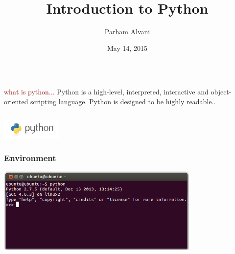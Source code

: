 \documentclass{beamer}
\title[Introduction]{Introduction to Python}
\author{Parham Alvani}
\institute[AUT] {
  Amirkabir University of Technology \\
  \medskip
  {\small\tt parham.alvani@gmail.com}
}
\date{May 14, 2015}
\begin{document}
\begin{frame}
\titlepage
\end{frame}


\section{}
\subsection{}

\begin{frame}
\begin{columns}
	\begin{column}{10cm}
		\vspace{2cm}
		\begin{block}{
				\centering\textcolor{darkred}{what is python...}}
				\justifying
				Python is a high-level, interpreted, interactive and object-oriented scripting language. Python is designed to be highly readable..\\
		\end{block}
	\end{column}
\end{columns}
\vspace{.75cm}
\hspace*{8.5cm}\includegraphics[width=3cm]{figs/python.jpeg}
\end{frame}

\begin{frame}
	\frametitle{Environment}
	\hspace*{1.5cm}\includegraphics[width=10cm]{figs/python-console-linux.png}
\end{frame}
\end{document}
